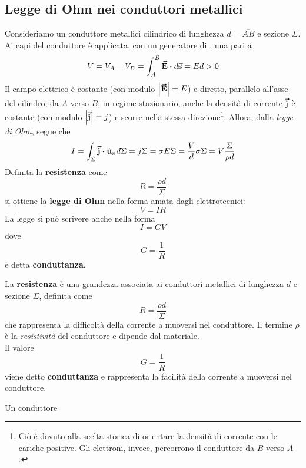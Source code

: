 \subsection{Legge di Ohm nei conduttori metallici}
Consideriamo un conduttore metallici cilindrico di lunghezza $d=\overline{AB}$ e sezione $\Sigma$. Ai capi del conduttore è applicata, con un generatore di \fem, una \ddp pari a
\begin{equation*}
	V=V_A-V_B=\int_{A}^{B}\vba{E}\vdot d\vba{s}=Ed>0
\end{equation*}
Il campo elettrico è costante (con modulo $\abs{\vb*{\va{E}}}=E$) e diretto, parallelo all'asse del cilindro, da $A$ verso $B$; in regime stazionario, anche la densità di corrente $\vb*{\va{j}}$ è costante (con modulo $\abs{\vb*{\va{j}}}=j$) e scorre nella stessa direzione\footnote{Ciò è dovuto alla scelta storica di orientare la densità di corrente con le cariche positive. Gli elettroni, invece, percorrono il conduttore da $B$ verso $A$.}. Allora, dalla \textit{legge di Ohm}, segue che
\begin{equation*}
	I=\int_{\Sigma}\vba{j}\vdot\vbh{u}_nd\Sigma=j\Sigma=\sigma E\Sigma=\frac{V}{d}\sigma\Sigma=V\frac{\Sigma}{\rho d}
\end{equation*}
Definita la \textbf{resistenza} come
\begin{equation*}
	R=\frac{\rho d}{\Sigma}
\end{equation*}
si ottiene la \textbf{legge di Ohm} nella forma amata dagli elettrotecnici:
\begin{equation}
	V=IR
\end{equation}
La legge si può scrivere anche nella forma
\begin{equation}
	I=GV
\end{equation}
dove
\begin{equation*}
	G=\frac{1}{R}
\end{equation*}
è detta \textbf{conduttanza}.
\begin{define}
	La \textbf{resistenza} è una grandezza associata ai conduttori metallici di lunghezza $d$ e sezione $\Sigma$, definita come
	\begin{equation*}
		R=\frac{\rho d}{\Sigma}
	\end{equation*}
	che rappresenta la difficoltà della corrente a muoversi nel conduttore. Il termine $\rho$ è la \textit{resistività} del conduttore e dipende dal materiale.\\
	Il valore
	\begin{equation}
		G=\frac{1}{R}
	\end{equation}
	viene detto \textbf{conduttanza} e rappresenta la facilità della corrente a muoversi nel conduttore.
\end{define}
Un conduttore 
